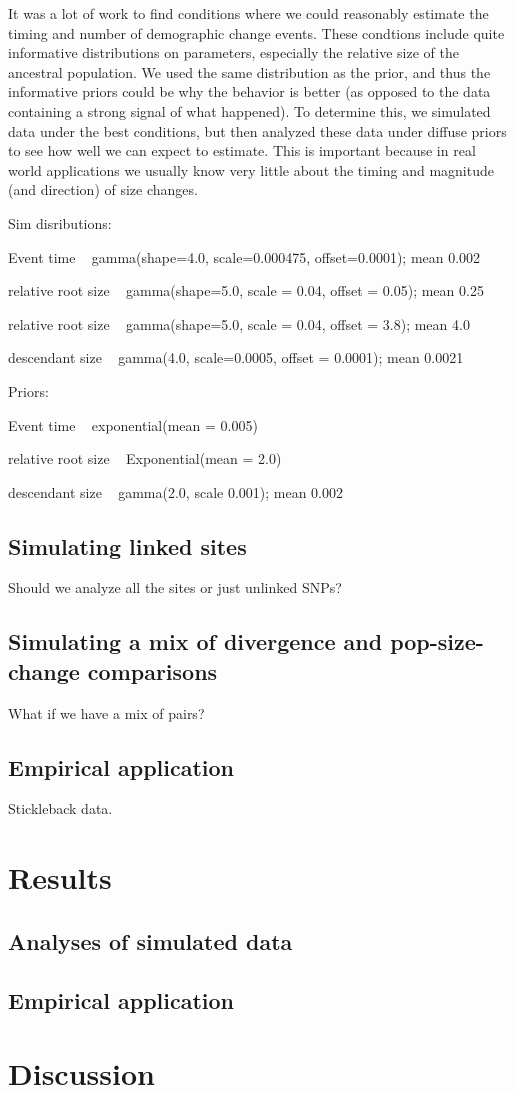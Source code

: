 It was a lot of work to find conditions where we could reasonably estimate
the timing and number of demographic change events.
These condtions include quite informative distributions on parameters,
especially the relative size of the ancestral population.
We used the same distribution as the prior, and thus the informative priors
could be why the behavior is better (as opposed to the data containing a strong
signal of what happened).
To determine this, we simulated data under the best conditions,
but then analyzed these data under diffuse priors to see how
well we can expect to estimate.
This is important because in real world applications we usually know very
little about the timing and magnitude (and direction) of size changes.

Sim disributions:

Event time ~ gamma(shape=4.0, scale=0.000475, offset=0.0001); mean 0.002

relative root size ~ gamma(shape=5.0, scale = 0.04, offset = 0.05); mean 0.25

relative root size ~ gamma(shape=5.0, scale = 0.04, offset = 3.8); mean 4.0

descendant size ~ gamma(4.0, scale=0.0005, offset = 0.0001); mean 0.0021

Priors:

Event time ~ exponential(mean = 0.005)

relative root size ~ Exponential(mean = 2.0)

descendant size ~ gamma(2.0, scale 0.001); mean 0.002



\subsection{Simulating linked sites}
Should we analyze all the sites or just unlinked SNPs?


\subsection{Simulating a mix of divergence and pop-size-change comparisons}
What if we have a mix of pairs?

\subsection{Empirical application}
Stickleback data.


\section{Results}

\subsection{Analyses of simulated data}


\subsection{Empirical application}


\section{Discussion}
